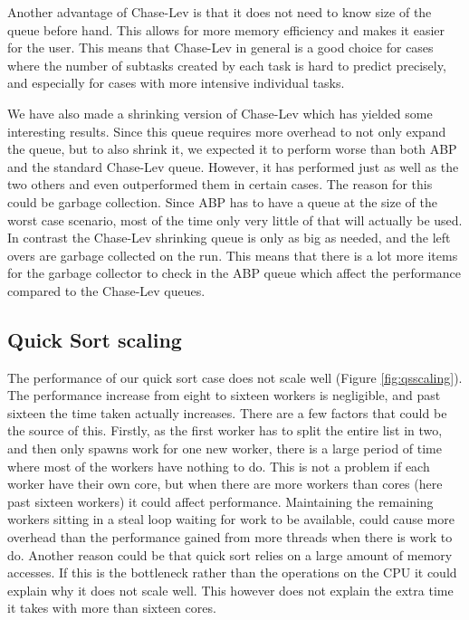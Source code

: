 Another advantage of Chase-Lev is that it does not need to know size of the queue before hand. This allows for more memory efficiency and makes it easier for the user. This means that Chase-Lev in general is a good choice for cases where the number of subtasks created by each task is hard to predict precisely, and especially for cases with more intensive individual tasks.

We have also made a shrinking version of Chase-Lev which has yielded some interesting results. Since this queue requires more overhead to not only expand the queue, but to also shrink it, we expected it to perform worse than both ABP and the standard Chase-Lev queue. However, it has performed just as well as the two others and even outperformed them in certain cases. The reason for this could be garbage collection. Since ABP has to have a queue at the size of the worst case scenario, most of the time only very little of that will actually be used. In contrast the Chase-Lev shrinking queue is only as big as needed, and the left overs are garbage collected on the run. This means that there is a lot more items for the garbage collector to check in the ABP queue which affect the performance compared to the Chase-Lev queues.

\subsection{Quick Sort scaling}
The performance of our quick sort case does not scale well (Figure \ref{fig:qsscaling}). The performance increase from eight to sixteen workers is negligible, and past sixteen the time taken actually increases. There are a few factors that could be the source of this. Firstly, as the first worker has to split the entire list in two, and then only spawns work for one new worker, there is a large period of time where most of the workers have nothing to do. This is not a problem if each worker have their own core, but when there are more workers than cores (here past sixteen workers) it could affect performance. Maintaining the remaining workers sitting in a steal loop waiting for work to be available, could cause more overhead than the performance gained from more threads when there is work to do. Another reason could be that quick sort relies on a large amount of memory accesses. If this is the bottleneck rather than the operations on the CPU it could explain why it does not scale well. This however does not explain the extra time it takes with more than sixteen cores.

